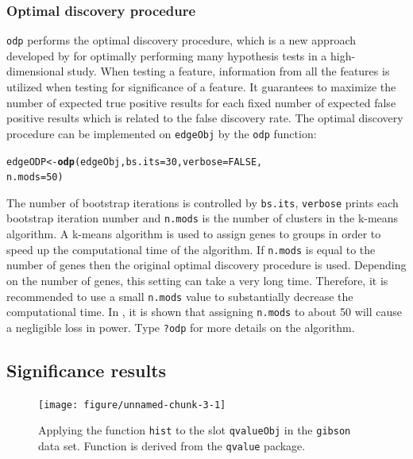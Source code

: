 \documentclass{article}\usepackage[]{graphicx}\usepackage[]{color}
\makeatletter
\newcommand{\hlnum}[1]{\textcolor[rgb]{0.686,0.059,0.569}{#1}}%
\newcommand{\hlstd}[1]{\textcolor[rgb]{0.345,0.345,0.345}{#1}}%
\newcommand{\hlkwb}[1]{\textcolor[rgb]{0.69,0.353,0.396}{#1}}%
\newcommand{\hlkwc}[1]{\textcolor[rgb]{0.333,0.667,0.333}{#1}}%
\newcommand{\hlkwd}[1]{\textcolor[rgb]{0.737,0.353,0.396}{\textbf{#1}}}%
\newenvironment{kframe}{%
 \def\at@end@of@kframe{}%
 \ifinner\ifhmode%
  \def\at@end@of@kframe{\end{minipage}}%
  \begin{minipage}{\columnwidth}%
 \fi\fi%
 \def\FrameCommand##1{\hskip\@totalleftmargin \hskip-\fboxsep
 \colorbox{shadecolor}{##1}\hskip-\fboxsep
     \hskip-\linewidth \hskip-\@totalleftmargin \hskip\columnwidth}%
 \MakeFramed {\advance\hsize-\width
   \@totalleftmargin\z@ \linewidth\hsize
   \@setminipage}}%
 {\par\unskip\endMakeFramed%
 \at@end@of@kframe}
\newenvironment{knitrout}{}{} %
\makeatother
\begin{document}
\subsubsection{Optimal discovery procedure}
{\tt odp} performs the optimal discovery procedure, which is a new approach developed by \cite{storey:2005} for optimally performing many hypothesis tests in a high-dimensional study. When testing a feature, information from all the features is utilized when testing for significance of a feature. It guarantees to maximize the number of expected true positive results for each fixed number of expected false positive results which is related to the false discovery rate. The optimal discovery procedure can be implemented on {\tt edgeObj} by the {\tt odp} function:
\begin{knitrout}
\color{fgcolor}\begin{kframe}
\begin{alltt}
\hlstd{edgeODP} \hlkwb{<-} \hlkwd{odp}\hlstd{(edgeObj,} \hlkwc{bs.its} \hlstd{=} \hlnum{30}\hlstd{,} \hlkwc{verbose} \hlstd{=} \hlnum{FALSE}\hlstd{,}
    \hlkwc{n.mods} \hlstd{=} \hlnum{50}\hlstd{)}
\end{alltt}
\end{kframe}
\end{knitrout}
The number of bootstrap iterations is controlled by {\tt bs.its}, {\tt verbose} prints each bootstrap iteration number and {\tt n.mods} is the number of clusters in the k-means algorithm. A k-means algorithm is used to assign genes to groups in order to speed up the computational time of the algorithm. If {\tt n.mods} is equal to the number of genes then the original optimal discovery procedure is used. Depending on the number of genes, this setting can take a very long time.  Therefore, it is recommended to use a small {\tt n.mods} value to substantially decrease the computational time. In \cite{woo:leek:storey:2011}, it is shown that assigning {\tt n.mods} to about 50 will cause a negligible loss in power. Type {\tt ?odp} for more details on the algorithm.

\subsection{Significance results}
\begin{figure}[t]
 \centering
\begin{knitrout}
\color{fgcolor}

{\centering \texttt{[image: figure/unnamed-chunk-3-1]} 

}



\end{knitrout}
\caption{Applying the function {\tt hist} to the slot {\tt qvalueObj} in the {\tt gibson} data set. Function is derived from the {\tt qvalue} package.}
\label{fig:gqvalHist}
\end{figure}
\end{document}
